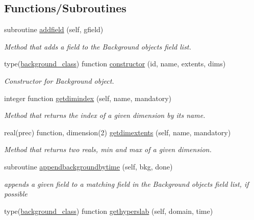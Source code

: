 \subsection*{Functions/\+Subroutines}
\begin{DoxyCompactItemize}
\item 
subroutine \mbox{\hyperlink{namespacebackground__mod_aa6ddc308698724f00ce1177ded5afc4c}{addfield}} (self, gfield)
\begin{DoxyCompactList}\small\item\em Method that adds a field to the Background object\textquotesingle{}s field list. \end{DoxyCompactList}\item 
type(\mbox{\hyperlink{structbackground__mod_1_1background__class}{background\+\_\+class}}) function \mbox{\hyperlink{namespacebackground__mod_ad0096fb6a5a11854fd70a7ce58dc3000}{constructor}} (id, name, extents, dims)
\begin{DoxyCompactList}\small\item\em Constructor for Background object. \end{DoxyCompactList}\item 
integer function \mbox{\hyperlink{namespacebackground__mod_a8a4c5fdcda63376bc3a984e9612dfb63}{getdimindex}} (self, name, mandatory)
\begin{DoxyCompactList}\small\item\em Method that returns the index of a given dimension by it\textquotesingle{}s name. \end{DoxyCompactList}\item 
real(prec) function, dimension(2) \mbox{\hyperlink{namespacebackground__mod_a64c3966a113bc0f3b603c591bc345ca1}{getdimextents}} (self, name, mandatory)
\begin{DoxyCompactList}\small\item\em Method that returns two reals, min and max of a given dimension. \end{DoxyCompactList}\item 
subroutine \mbox{\hyperlink{namespacebackground__mod_a02fa44cb4575159362bfa3b55520d387}{appendbackgroundbytime}} (self, bkg, done)
\begin{DoxyCompactList}\small\item\em appends a given field to a matching field in the Background object\textquotesingle{}s field list, if possible \end{DoxyCompactList}\item 
type(\mbox{\hyperlink{structbackground__mod_1_1background__class}{background\+\_\+class}}) function \mbox{\hyperlink{namespacebackground__mod_ae26fda3baab915148ec5749d1eda2ea6}{gethyperslab}} (self, domain, time)

\end{DoxyCompactItemize}
